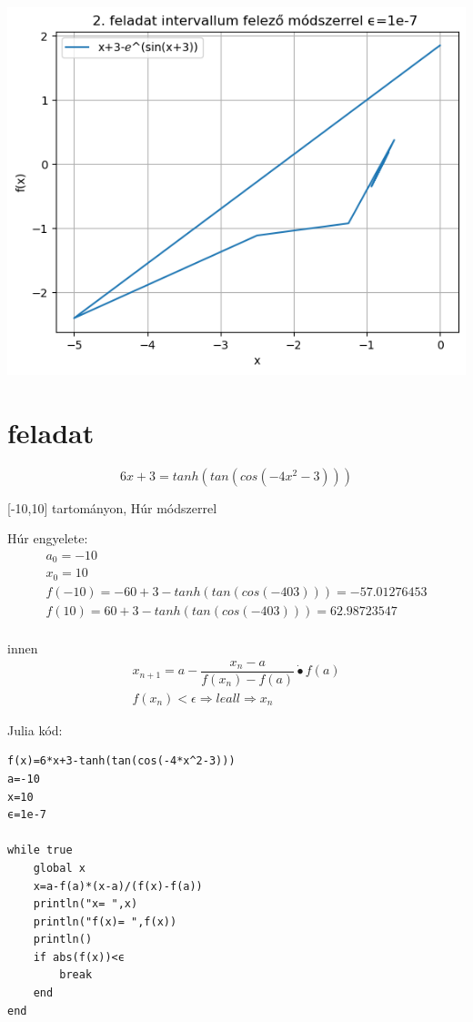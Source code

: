 \documentclass{article}
\begin{document}
\includegraphics[scale=1]{../plot_3.png} 

\section{feladat}

\begin{equation}
6x+3 = tanh(tan(cos(-4x^{2}-3)))
\end{equation}

[-10,10] tartományon, Húr módszerrel

Húr engyelete:
\begin{multline}
a_0 = -10\\
x_0 = 10\\
f(-10)=-60+3-tanh(tan(cos(-403))) = -57.01276453\\
f(10) = 60+3-tanh(tan(cos(-403))) = 62.98723547\\
\end{multline}

innen 
\begin{multline}
x_{n+1} = a - \dfrac{x_n - a}{f(x_n) - f(a)} \dot{•} f(a)\\
f(x_n) \lt \epsilon \Rightarrow leall \Rightarrow x_n
\end{multline}

Julia kód:

\begin{verbatim}
f(x)=6*x+3-tanh(tan(cos(-4*x^2-3)))
a=-10
x=10
ϵ=1e-7

while true
    global x
    x=a-f(a)*(x-a)/(f(x)-f(a))
    println("x= ",x)
    println("f(x)= ",f(x))
    println()
    if abs(f(x))<ϵ
        break
    end
end
\end{verbatim}
\end{document}

